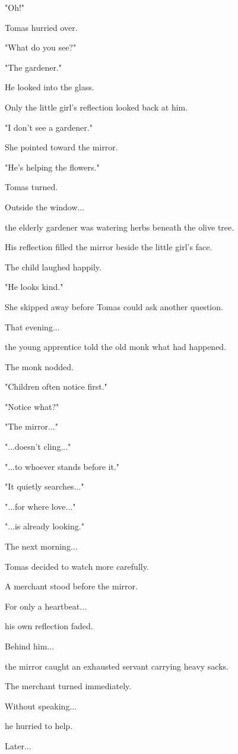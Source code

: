 \documentclass[12pt,openany]{book}
\begin{document}
"Oh!"

Tomas hurried over.

"What do you see?"

"The gardener."

He looked into the glass.

Only the little girl's reflection looked back at him.

"I don't see a gardener."

She pointed toward the mirror.

"He's helping the flowers."

Tomas turned.

Outside the window...

the elderly gardener was watering herbs beneath the olive tree.

His reflection filled the mirror beside the little girl's face.

The child laughed happily.

"He looks kind."

She skipped away before Tomas could ask another question.

That evening...

the young apprentice told the old monk what had happened.

The monk nodded.

"Children often notice first."

"Notice what?"

"The mirror..."

"...doesn't cling..."

"...to whoever stands before it."

"It quietly searches..."

"...for where love..."

"...is already looking."

The next morning...

Tomas decided to watch more carefully.

A merchant stood before the mirror.

For only a heartbeat...

his own reflection faded.

Behind him...

the mirror caught an exhausted servant carrying heavy sacks.

The merchant turned immediately.

Without speaking...

he hurried to help.

Later...
\end{document}
